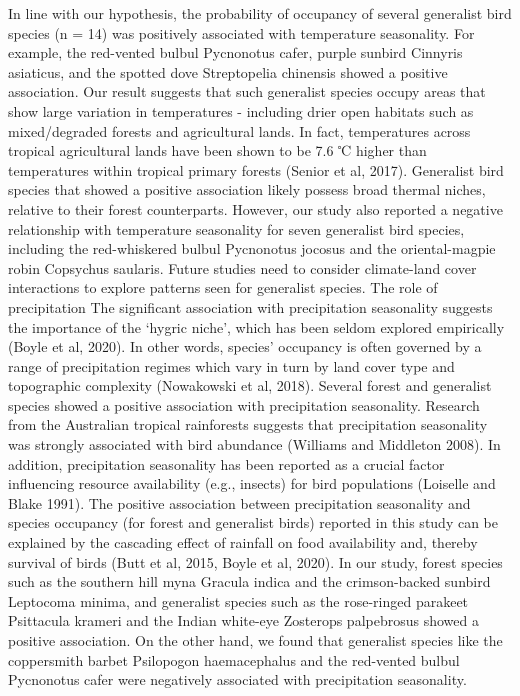 In line with our hypothesis, the probability of occupancy of several generalist bird species (n = 14) was positively associated with temperature seasonality.
For example, the red-vented bulbul Pycnonotus cafer, purple sunbird Cinnyris asiaticus, and the spotted dove Streptopelia chinensis showed a positive association.
Our result suggests that such generalist species occupy areas that show large variation in temperatures - including drier open habitats such as mixed/degraded forests and agricultural lands.
In fact, temperatures across tropical agricultural lands have been shown to be 7.6 ℃ higher than temperatures within tropical primary forests (Senior et al, 2017).
Generalist bird species that showed a positive association likely possess broad thermal niches, relative to their forest counterparts.
However, our study also reported a negative relationship with temperature seasonality for seven generalist bird species, including the red-whiskered bulbul Pycnonotus jocosus and the oriental-magpie robin Copsychus saularis.
Future studies need to consider climate-land cover interactions to explore patterns seen for generalist species.
The role of precipitation 
The significant association with precipitation seasonality suggests the importance of the `hygric niche', which has been seldom explored empirically (Boyle et al, 2020).
In other words, species' occupancy is often governed by a range of precipitation regimes which vary in turn by land cover type and topographic complexity (Nowakowski et al, 2018).
Several forest and generalist species showed a positive association with precipitation seasonality.
Research from the Australian tropical rainforests suggests that precipitation seasonality was strongly associated with bird abundance (Williams and Middleton 2008).
In addition, precipitation seasonality has been reported as a crucial factor influencing resource availability (e.g., insects) for bird populations (Loiselle and Blake 1991).
The positive association between precipitation seasonality and species occupancy (for forest and generalist birds) reported in this study can be explained by the cascading effect of rainfall on food availability and, thereby survival of birds (Butt et al, 2015, Boyle et al, 2020).
In our study, forest species such as the southern hill myna Gracula indica and the crimson-backed sunbird Leptocoma minima, and generalist species such as the rose-ringed parakeet Psittacula krameri and the Indian white-eye Zosterops palpebrosus showed a positive association.
On the other hand, we found that generalist species like the coppersmith barbet Psilopogon haemacephalus and the red-vented bulbul Pycnonotus cafer were negatively associated with precipitation seasonality.
